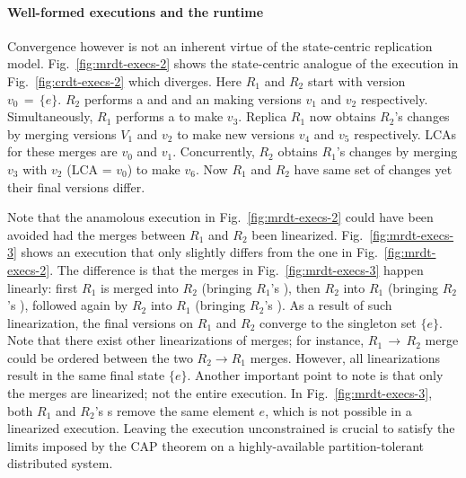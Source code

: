 \noindent\paragraph{Well-formed executions and the \quark runtime}
Convergence however is not an inherent virtue of the state-centric
replication model. Fig.~\ref{fig:mrdt-execs-2} shows the state-centric
analogue of the execution in Fig.~\ref{fig:crdt-execs-2} which
diverges. Here $R_1$ and $R_2$ start with version $v_0 \,=\, \{e\}$.
$R_2$ performs a  and and an  making versions
$v_1$ and $v_2$ respectively. Simultaneously, $R_1$ performs a
 to make $v_3$. Replica $R_1$ now obtains $R_2$'s changes by
merging versions $V_1$ and $v_2$ to make new versions $v_4$ and $v_5$
respectively. LCAs for these merges are $v_0$ and $v_1$. Concurrently,
$R_2$ obtains $R_1$'s changes by merging $v_3$ with $v_2$ (LCA =
$v_0$) to make $v_6$.  Now $R_1$ and $R_2$ have same set of changes
yet their final versions differ.

Note that the anamolous execution in Fig.~\ref{fig:mrdt-execs-2} could
have been avoided had the merges between $R_1$ and $R_2$ been
linearized. Fig.~\ref{fig:mrdt-execs-3} shows an execution that only
slightly differs from the one in Fig.~\ref{fig:mrdt-execs-2}. The
difference is that the merges in Fig.~\ref{fig:mrdt-execs-3} happen
linearly: first $R_1$ is merged into $R_2$ (bringing $R_1$'s
), then $R_2$ into $R_1$ (bringing $R_2$'s ),
followed again by $R_2$ into $R_1$ (bringing $R_2$'s ). As a
result of such linearization, the final versions on $R_1$ and $R_2$
converge to the singleton set $\{e\}$. Note that there exist other
linearizations of merges; for instance, $R_1 \,\rightarrow\, R_2$
merge could be ordered between the two $R_2 \rightarrow R_1$ merges.
However, all linearizations result in the same final state $\{e\}$.
Another important point to note is that only the merges are
linearized; not the entire execution. In Fig.~\ref{fig:mrdt-execs-3},
both $R_1$ and $R_2$'s s remove the same element $e$, which
is not possible in a linearized execution. Leaving the execution
unconstrained is crucial to satisfy the limits imposed by the CAP
theorem on a highly-available partition-tolerant distributed system.

